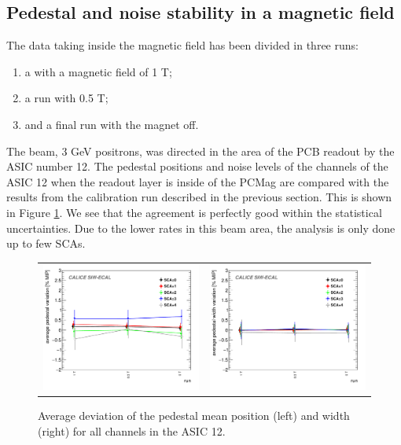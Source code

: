 \documentclass[a4paper,11pt]{article}
\begin{document}
\subsection{Pedestal and noise stability in a magnetic field}
\label{sec:magnetic}

The data taking inside the magnetic field has been divided in three runs:
\begin{enumerate}
\item a with a magnetic field of 1 T;
\item a run with 0.5 T;
\item and a final run with the magnet off.
\end{enumerate}

The beam, 3 GeV positrons, was directed in the area of the PCB readout by the ASIC number 12.
The pedestal positions and noise levels of the channels of the ASIC 12 when the
readout layer is inside of the PCMag are compared with the results from the calibration run described in the previous section.
This is shown in Figure \ref{pedestal_magnetic}.
We see that the agreement is perfectly good within the statistical uncertainties.
Due to the lower rates in this beam area, the
analysis is only done up to few SCAs.

\begin{figure}[!t]
  \centering
  \begin{tabular}{ll}
    \includegraphics[width=2.8in]{1T_summary_pedestal-eps-converted-to.pdf} & \includegraphics[width=2.8in]{1T_summary_noise-eps-converted-to.pdf}
  \end{tabular}
  \caption{Average deviation of the pedestal mean position (left) and width (right) for all channels in the ASIC 12.}
\label{pedestal_magnetic}
\end{figure}
\end{document}
